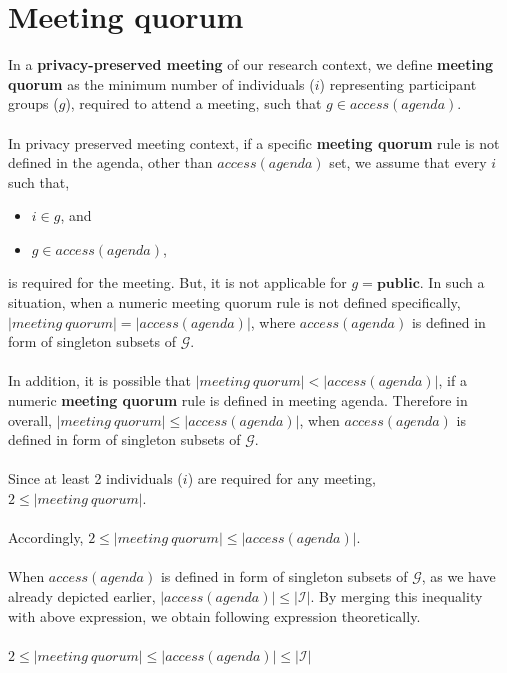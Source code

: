 \section{Meeting quorum}
\noindent
In a \textbf{privacy-preserved meeting} of our research context, we define \textbf{meeting quorum} as the minimum number of individuals ($i$) representing participant groups ($g$), required to attend a meeting, such that $g \in access(agenda)$. \\ \\
In privacy preserved meeting context, if a specific \textbf{meeting quorum} rule is not defined in the agenda, other than $access(agenda)$ set, we assume that every $i$ such that, 
\begin{itemize}
    \item $i \in g$, and
    \item $g \in access(agenda)$, 
\end{itemize}
\noindent
is required for the meeting. But, it is not applicable for $g = \textbf{public}$. In such a situation, when a numeric meeting quorum rule is not defined specifically, $|meeting\ quorum| = |access(agenda)|$, where $access(agenda)$ is defined in form of singleton subsets of $\mathcal{G}$. \\ \\
\noindent
In addition, it is possible that $|meeting\ quorum| < |access(agenda)|$, if a numeric \textbf{meeting quorum} rule is defined in meeting agenda. Therefore in overall, $|meeting\ quorum| \leq |access(agenda)|$, when $access(agenda)$ is defined in form of singleton subsets of $\mathcal{G}$. \\ \\
Since at least 2 individuals ($i$) are required for any meeting, $2 \leq |meeting\ quorum|$. \\ \\
Accordingly, $2 \leq |meeting\ quorum| \leq |access(agenda)|$. \\ \\
When $access(agenda)$ is defined in form of singleton subsets of $\mathcal{G}$, as we have already depicted earlier, $|access(agenda)| \leq |\mathcal{I}|$. By merging this inequality with above expression, we obtain following expression theoretically.\\ \\
$2 \leq |meeting\ quorum| \leq |access(agenda)| \leq |\mathcal{I}|$  \\ \\

